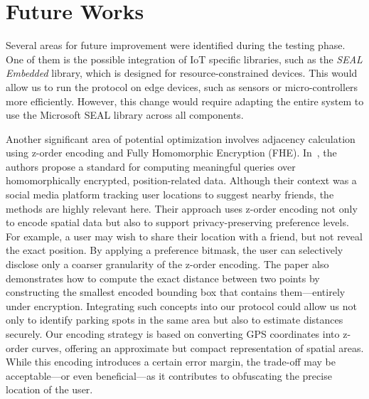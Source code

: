 \section{Future Works}

Several areas for future improvement were identified during the testing phase. One of them is the possible integration of IoT specific libraries, such as the \emph{SEAL Embedded} \cite{sealembedded} library, which is designed for resource-constrained devices. This would allow us to run the protocol on edge devices, such as sensors or micro-controllers more efficiently. However, this change would require adapting the entire system to use the Microsoft SEAL\cite{sealcrypto} library across all components.

Another significant area of potential optimization involves adjacency calculation using z-order encoding and Fully Homomorphic Encryption (FHE). In~\cite{zhang2020privacy}, the authors propose a standard for computing meaningful queries over homomorphically encrypted, position-related data. Although their context was a social media platform tracking user locations to suggest nearby friends, the methods are highly relevant here. Their approach uses z-order encoding not only to encode spatial data but also to support privacy-preserving preference levels.
For example, a user may wish to share their location with a friend, but not reveal the exact position. By applying a preference bitmask, the user can selectively disclose only a coarser granularity of the z-order encoding. The paper also demonstrates how to compute the exact distance between two points by constructing the smallest encoded bounding box that contains them—entirely under encryption. Integrating such concepts into our protocol could allow us not only to identify parking spots in the same area but also to estimate distances securely.
Our encoding strategy is based on converting GPS coordinates into z-order curves, offering an approximate but compact representation of spatial areas. While this encoding introduces a certain error margin, the trade-off may be acceptable—or even beneficial—as it contributes to obfuscating the precise location of the user.

